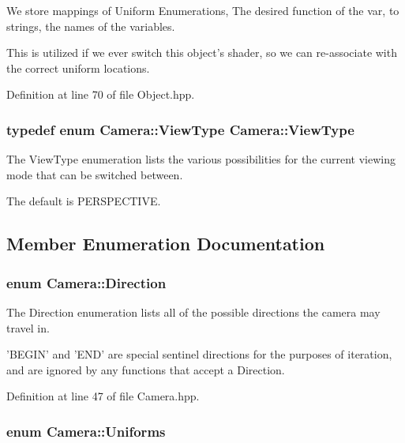 We store mappings of Uniform Enumerations, The desired function of the var, to strings, the names of the variables. 

This is utilized if we ever switch this object's shader, so we can re-\/associate with the correct uniform locations. 

Definition at line 70 of file Object.\-hpp.

\hypertarget{class_camera_a5b2dc5eaed6cbaabee0eea3f2714acd7}{
\subsubsection[{View\-Type}]{\setlength{\rightskip}{0pt plus 5cm}typedef enum {\bf Camera\-::\-View\-Type}  {\bf Camera\-::\-View\-Type}}}\label{class_camera_a5b2dc5eaed6cbaabee0eea3f2714acd7}


The View\-Type enumeration lists the various possibilities for the current viewing mode that can be switched between. 

The default is P\-E\-R\-S\-P\-E\-C\-T\-I\-V\-E. 

\subsection{Member Enumeration Documentation}
\hypertarget{class_camera_a80cb65605322d27ad3b6d973484509ec}{
\subsubsection[{Direction}]{\setlength{\rightskip}{0pt plus 5cm}enum {\bf Camera\-::\-Direction}}}\label{class_camera_a80cb65605322d27ad3b6d973484509ec}


The Direction enumeration lists all of the possible directions the camera may travel in. 

'B\-E\-G\-I\-N' and 'E\-N\-D' are special sentinel directions for the purposes of iteration, and are ignored by any functions that accept a Direction. 

Definition at line 47 of file Camera.\-hpp.

\hypertarget{class_camera_a630738fd23098d44c0d15ee28d5649dd}{
\subsubsection[{Uniforms}]{\setlength{\rightskip}{0pt plus 5cm}enum {\bf Camera\-::\-Uniforms}}}\label{class_camera_a630738fd23098d44c0d15ee28d5649dd}


